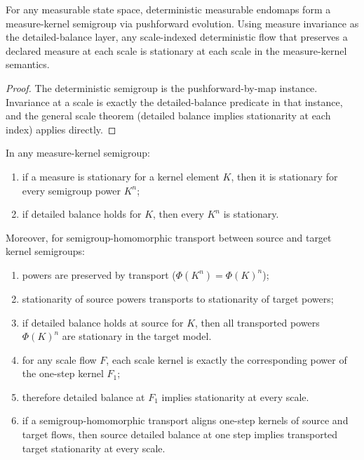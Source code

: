 \begin{corollary}\label{thm:deterministic-kernel-scale-stationary}
For any measurable state space, deterministic measurable endomaps form a measure-kernel semigroup via pushforward evolution. Using measure invariance as the detailed-balance layer, any scale-indexed deterministic flow that preserves a declared measure at each scale is stationary at each scale in the measure-kernel semantics.
\end{corollary}

\begin{proof}
The deterministic semigroup is the pushforward-by-map instance. Invariance at a scale is exactly the detailed-balance predicate in that instance, and the general scale theorem (detailed balance implies stationarity at each index) applies directly.
\end{proof}

\begin{theorem}\label{thm:kernel-power-stationarity-transport}
In any measure-kernel semigroup:
\begin{enumerate}
\item if a measure is stationary for a kernel element $K$, then it is stationary for every semigroup power $K^n$;
\item if detailed balance holds for $K$, then every $K^n$ is stationary.
\end{enumerate}
Moreover, for semigroup-homomorphic transport between source and target kernel semigroups:
\begin{enumerate}
\item powers are preserved by transport ($\Phi(K^n)=\Phi(K)^n$);
\item stationarity of source powers transports to stationarity of target powers;
\item if detailed balance holds at source for $K$, then all transported powers $\Phi(K)^n$ are stationary in the target model.
\item for any scale flow $F$, each scale kernel is exactly the corresponding power of the one-step kernel $F_1$;
\item therefore detailed balance at $F_1$ implies stationarity at every scale.
\item if a semigroup-homomorphic transport aligns one-step kernels of source and target flows, then source detailed balance at one step implies transported target stationarity at every scale.
\end{enumerate}
\end{theorem}

